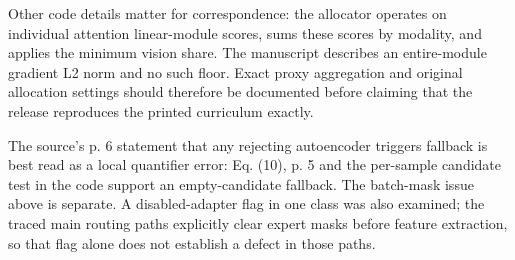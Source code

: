 \documentclass[10pt]{article}
\begin{document}
Other code details matter for correspondence: the allocator operates on individual attention linear-module scores, sums these scores by modality, and applies the minimum vision share. The manuscript describes an entire-module gradient L2 norm and no such floor. Exact proxy aggregation and original allocation settings should therefore be documented before claiming that the release reproduces the printed curriculum exactly.\par
The source’s p. 6 statement that any rejecting autoencoder triggers fallback is best read as a local quantifier error: Eq. (10), p. 5 and the per-sample candidate test in the code support an empty-candidate fallback. The batch-mask issue above is separate. A disabled-adapter flag in one class was also examined; the traced main routing paths explicitly clear expert masks before feature extraction, so that flag alone does not establish a defect in those paths.\par
\end{document}
